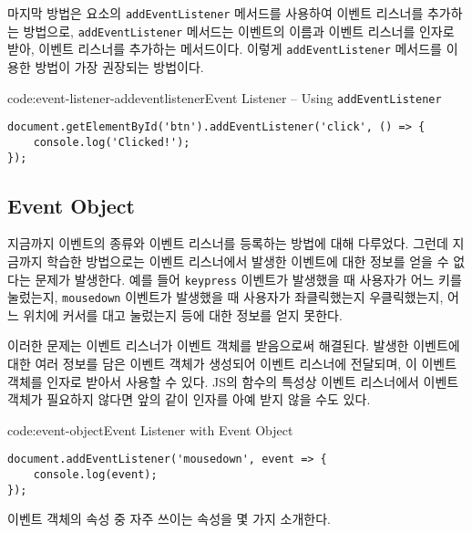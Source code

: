 마지막 방법은 요소의 \texttt{addEventListener} 메서드를 사용하여 이벤트 리스너를 추가하는 방법으로, \texttt{addEventListener} 메서드는 이벤트의 이름과 이벤트 리스너를 인자로 받아, 이벤트 리스너를 추가하는 메서드이다. 이렇게 \texttt{addEventListener} 메서드를 이용한 방법이 가장 권장되는 방법이다.

\begin{codeenv}{code:event-listener-addeventlistener}{Event Listener – Using \texttt{addEventListener}}\begin{verbatim}
document.getElementById('btn').addEventListener('click', () => {
    console.log('Clicked!');
});
\end{verbatim}
\end{codeenv}

\subsection*{Event Object}

지금까지 이벤트의 종류와 이벤트 리스너를 등록하는 방법에 대해 다루었다. 그런데 지금까지 학습한 방법으로는 이벤트 리스너에서 발생한 이벤트에 대한 정보를 얻을 수 없다는 문제가 발생한다. 예를 들어 \texttt{keypress} 이벤트가 발생했을 때 사용자가 어느 키를 눌렀는지, \texttt{mousedown} 이벤트가 발생했을 때 사용자가 좌클릭했는지 우클릭했는지, 어느 위치에 커서를 대고 눌렀는지 등에 대한 정보를 얻지 못한다.

이러한 문제는 이벤트 리스너가 이벤트 객체를 받음으로써 해결된다. 발생한 이벤트에 대한 여러 정보를 담은 이벤트 객체가 생성되어 이벤트 리스너에 전달되며, 이 이벤트 객체를 인자로 받아서 사용할 수 있다. JS의 함수의 특성상 이벤트 리스너에서 이벤트 객체가 필요하지 않다면 앞의 \와 같이 인자를 아예 받지 않을 수도 있다.
\newpage

\begin{codeenv}{code:event-object}{Event Listener with Event Object}\begin{verbatim}
document.addEventListener('mousedown', event => {
    console.log(event);
});
\end{verbatim}
\end{codeenv}

이벤트 객체의 속성 중 자주 쓰이는 속성을 몇 가지 소개한다.

